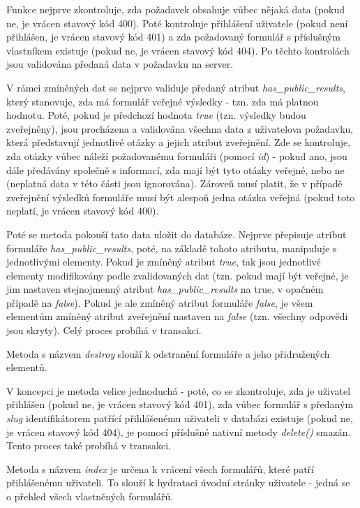 			Funkce nejprve zkontroluje, zda požadavek obsahuje vůbec nějaká data (pokud ne, je vrácen stavový kód 400). Poté kontroluje přihlášení uživatele (pokud není přihlášen, je vrácen stavový kód 401) a zda požadovaný formulář s příslušným vlastníkem existuje (pokud ne, je vrácen stavový kód 404). Po těchto kontrolách jsou validována předaná data v požadavku na server.
			
			V rámci zmíněných dat se nejprve validuje předaný atribut \textit{has\_public\_results}, který stanovuje, zda má formulář veřejné výsledky - tzn. zda má platnou hodnotu. Poté, pokud je předchozí hodnota \textit{true} (tzn. výsledky budou zveřejněny), jsou procházena a validována všechna data z uživatelova požadavku, která představují jednotlivé otázky a jejich atribut zveřejnění. Zde se kontroluje, zda otázky vůbec náleží požadovanému formuláři (pomocí \textit{id}) - pokud ano, jsou dále předávány společně s informací, zda mají být tyto otázky veřejné, nebo ne (neplatná data v této části jsou ignorována). Zároveň musí platit, že v případě zveřejnění výsledků formuláře musí být alespoň jedna otázka veřejná (pokud toto neplatí, je vrácen stavový kód 400).
			
			Poté se metoda pokouší tato data uložit do databáze. Nejprve přepisuje atribut formuláře \textit{has\_public\_results}, poté, na základě tohoto atributu, manipuluje s jednotlivými elementy. Pokud je zmíněný atribut \textit{true}, tak jsou jednotlivé elementy modifikovány podle zvalidovaných dat (tzn. pokud mají být veřejné, je jim nastaven stejnojmenný atribut \textit{has\_public\_results} na true, v opačném případě na \textit{false}). Pokud je ale zmíněný atribut formuláře \textit{false}, je všem elementům zmíněný atribut zveřejnění nastaven na \textit{false} (tzn. všechny odpovědi jsou skryty). Celý proces probíhá v transakci.
			
			\label{sec:form_destroy}
			Metoda s názvem \textit{destroy} slouží k odstranění formuláře a jeho přidružených elementů.
			
			V koncepci je metoda velice jednoduchá - poté, co se zkontroluje, zda je uživatel přihlášen (pokud ne, je vrácen stavový kód 401), zda vůbec formulář s předaným \textit{slug} identifikátorem patřící přihlášenému uživateli v databázi existuje (pokud ne, je vrácen stavový kód 404), je pomocí příslušné nativní metody \textit{delete()} smazán. Tento proces také probíhá v transakci.
			
			Metoda s názvem \textit{index} je určena k vrácení všech formulářů, které patří přihlášenému uživateli. To slouží k hydrataci úvodní stránky uživatele - jedná se o přehled všech vlastněných formulářů. 
			
